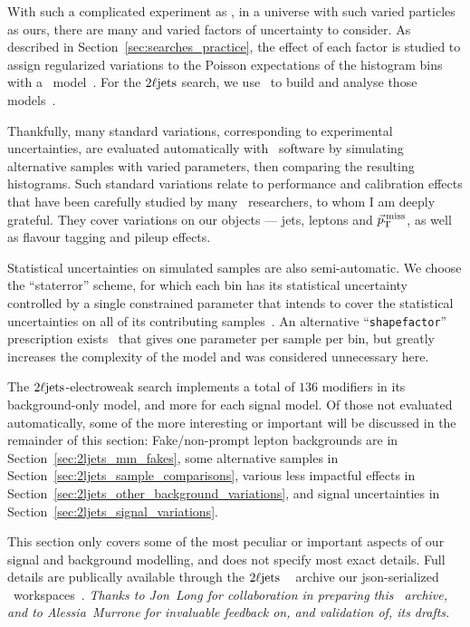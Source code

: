 With such a complicated experiment as \atlas, in a universe with such varied
particles as ours, there are many and varied factors of uncertainty to consider.
As described in Section~\ref{sec:searches_practice}, the effect of each
factor is studied to assign regularized variations to the Poisson expectations
of the histogram bins with a \histfactory\ model~\cite{cranmer2012histfactory}.
For the $2\ell\mathrm{jets}$ search, we use \histfitter\ to build and analyse those
models~\cite{Besjes_2015,baak2015histfitter}.

Thankfully, many standard variations, corresponding to experimental
uncertainties, are evaluated automatically with \atlas\ software by simulating
alternative samples with varied parameters, then comparing the resulting
histograms.
Such standard variations relate to performance and calibration effects that
have been carefully studied by many \atlas\ researchers, to whom I am deeply
grateful.
They cover variations on our objects --- jets, leptons and $\vec p_\mathrm{T}^\mathrm{\:miss}$, as well
as flavour tagging and pileup effects.

Statistical uncertainties on simulated samples are also semi-automatic.
We choose the ``staterror'' scheme, for which each bin has its statistical
uncertainty controlled by a single constrained parameter that intends to cover
the statistical uncertainties on all of its contributing
samples~\cite{cranmer2012histfactory}.
An alternative ``\texttt{shapefactor}'' prescription
exists~\cite{cranmer2012histfactory} that gives one parameter
per sample per bin, but greatly increases the complexity of the model and
was considered unnecessary here.

The $2\ell\mathrm{jets}$-electroweak search implements a total of $136$ modifiers in its
background-only model, and more for each signal model.
Of those not evaluated automatically, some of the more interesting or important
will be discussed in the remainder of this section:
Fake/non-prompt lepton backgrounds are in Section~\ref{sec:2ljets_mm_fakes},
some alternative samples in Section~\ref{sec:2ljets_sample_comparisons},
various less impactful effects in
Section~\ref{sec:2ljets_other_background_variations},
and signal uncertainties in
Section~\ref{sec:2ljets_signal_variations}.

This section only covers some of the most peculiar or important aspects
of our signal and background modelling, and does not specify most exact
details.
Full details are publically available through the $2\ell\mathrm{jets}$
\hepdata~\cite{hepdata.116034, Maguire_2017} archive our json-serialized \pyhf\
workspaces~\cite{cranmer2012histfactory, heinrich2021pyhf}.
\emph{Thanks to Jon~Long for collaboration in preparing this \hepdata\ archive,
and to Alessia~Murrone for invaluable feedback on, and validation of, its
drafts.}



